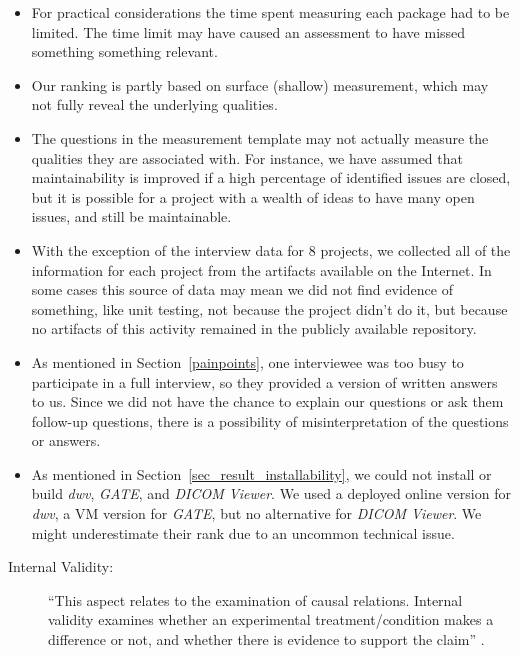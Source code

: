 \documentclass[final, 3p, times, authoryear]{elsarticle}
\begin{document}
\begin{itemize}
\item For practical considerations the time spent measuring each package had to
be limited.  The time limit may have caused an assessment to have missed
something something relevant.
\item Our ranking is partly based on surface (shallow) measurement, which may
not fully reveal the underlying qualities.
\item The questions in the measurement template may not actually measure the
qualities they are associated with.  For instance, we have assumed that
maintainability is improved if a high percentage of identified issues are
closed, but it is possible for a project with a wealth of ideas to have many
open issues, and still be maintainable.
\item With the exception of the interview data for 8 projects, we collected all
of the information for each project from the artifacts available on the
Internet. In some cases this source of data may mean we did not find evidence of
something, like unit testing, not because the project didn't do it, but because
no artifacts of this activity remained in the publicly available repository.
\item As mentioned in Section~\ref{painpoints}, one interviewee was too busy
to participate in a full interview, so they provided a version of written answers
to us. Since we did not have the chance to explain our questions or ask them
follow-up questions, there is a possibility of misinterpretation of the
questions or answers.
\item As mentioned in Section~\ref{sec_result_installability}, we could not
install or build \textit{dwv}, \textit{GATE}, and \textit{DICOM Viewer}. We used
a deployed online version for \textit{dwv}, a VM version for \textit{GATE}, but
no alternative for \textit{DICOM Viewer}. We might underestimate their rank due
to an uncommon technical issue.
\end{itemize}

\begin{description}
    \item[Internal Validity:] ``This aspect relates to the examination of causal
    relations. Internal validity examines whether an experimental
    treatment/condition makes a difference or not, and whether there is evidence
    to support the claim'' \citep{AmpatzoglouEtAl2019}.
\end{description}
\end{document}
